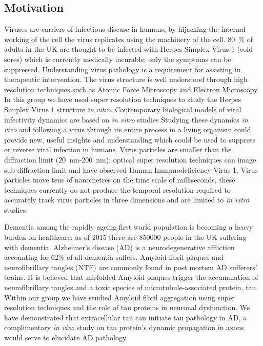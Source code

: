 \subsection{Motivation}
Viruses are carriers of infectious disease in humans, by hijacking the internal working of the cell the virus replicates using the machinery of the cell.
\SI{80}{\percent} of adults in the UK are thought to be infected with Herpes Simplex Virus 1 (cold sores) which is currently medically incurable\cite{Herpes}; only the symptoms can be suppressed.
Understanding virus pathology is a requirement for assisting in therapeutic intervention.
The virus structure is well understood through high resolution techniques such as Atomic Force Microscopy and Electron Microscopy.
In this group we have used super resolution techniques to study the Herpes Simplex Virus 1 structure \textit{in vitro}\cite{Laine2015}.
Contemporary biological models of viral infectivity dynamics are based on \textit{in vitro} studies %
Studying these dynamics \textit{in vivo} and following a virus through its entire process in a living organism could provide new, useful insights and understanding which could be used to suppress or reverse viral infection in humans.
Virus particles are smaller than the diffraction limit  (\SI{20}{\nano\meter}-\SI{200}{\nano\meter}); optical super resolution techniques can image sub-diffraction limit and have observed Human Immunodeficiency Virus 1\cite{Pereira2012}.
Virus particles move tens of nanometres on the time scale of milliseconds\cite{Brandenburg2007}, these techniques currently do not produce the temporal resolution required to accurately track virus particles\cite{Brandenburg2007} in three dimensions and are limited to \textit{in vitro} studies.

Dementia among the rapidly ageing first world population is becoming a heavy burden on healthcare; as of 2015 there are \SI{850000}{} people in the UK suffering with dementia\cite{Judd}.
Alzheimer's disease (AD) is a neurodegenerative affliction accounting for 62\% of all dementia suffers.
Amyloid fibril plaques and neurofibrillary tangles (NTF) are commonly found in post mortem AD sufferers' brains.
It is believed that misfolded Amyloid plaques trigger the accumulation of neurofibrillary tangles and a toxic species of microtubule-associated protein, tau\cite{Ittner2011,King2002}.
Within our group we have studied Amyloid fibril aggregation using super resolution techniques and the role of tau proteins in neuronal dysfunction.
We have demonstrated that extracellular tau can initiate tau pathology in AD\cite{Michel2014a}, a complimentary \textit{in vivo} study on tau protein's\cite{DeCalignon2012} dynamic propagation in axons would serve to elucidate AD pathology.


